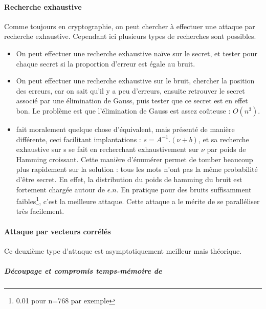 \documentclass{article}		%
\theoremstyle{definition}
\theoremstyle{plain}
\theoremstyle{plain}
\theoremstyle{plain}
\theoremstyle{plain}
\theoremstyle{plain}
\begin{document}
\paragraph{Recherche exhaustive}
Comme toujours en cryptographie, on peut chercher à effectuer une attaque
par recherche exhaustive. Cependant ici plusieurs types de recherches sont
possibles.
\begin{itemize}
\item On peut effectuer une recherche exhaustive naïve sur le
secret, et tester pour chaque secret si la proportion d'erreur est égale
au bruit.
\item On peut effectuer une recherche exhaustive sur le bruit, chercher
la position des erreurs, car on sait qu'il y a peu d'erreurs, ensuite
retrouver le secret associé par une élimination de Gauss, puis tester que
ce secret est en effet bon. Le problème est que l'élimination de Gauss
est assez coûteuse : $O(n^3)$.
\item \cite{Gol} fait moralement quelque chose d'équivalent, mais
présenté de manière différente, ceci facilitant implantations :
$s=A^{-1}.(\nu+b)$, et sa recherche
exhaustive sur s se fait en recherchant exhaustivement sur $\nu$ par poids
de Hamming croissant. Cette manière d'énumérer permet de tomber beaucoup
plus rapidement sur la solution : tous les mots n'ont pas la même
probabilité d'être secret. En effet, la distribution du poids de
hamming du bruit est fortement chargée autour de $\epsilon.n$. En pratique pour des bruits suffisamment
faibles\footnote{0.01 pour n=768 par exemple}, c'est la meilleure attaque. Cette attaque a
le mérite de se paralléliser très facilement. 
\end{itemize} 

\paragraph{Attaque par vecteurs corrélés}
Ce deuxième type d'attaque est asymptotiquement meilleur mais théorique.
\subparagraph{Découpage et compromis temps-mémoire de \cite{Grigo}}
\end{document}
